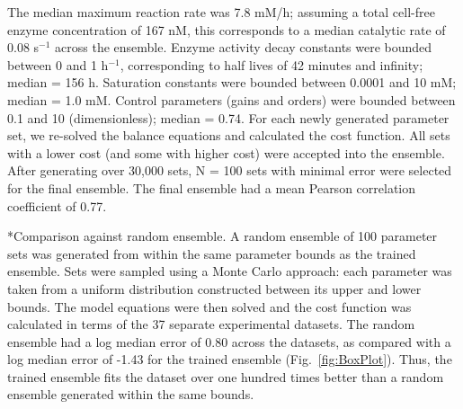 \documentclass[12pt]{article}
\makeatletter
\renewcommand\subsection{\@startsection
	{subsection}{2}{0mm}
	{-0.05in}
	{-0.5\baselineskip}
	{\normalfont\normalsize\bfseries}}
\makeatother
\begin{document}
The median maximum reaction rate was 7.8 mM/h; assuming a total cell-free enzyme concentration of 167 nM, this corresponds to a median catalytic rate of 0.08 s$^{-1}$ across the ensemble.
Enzyme activity decay constants were bounded between 0 and 1 h$^{-1}$, corresponding to half lives of 42 minutes and infinity; median = 156 h.
Saturation constants were bounded between 0.0001 and 10 mM; median = 1.0 mM.
Control parameters (gains and orders) were bounded between 0.1 and 10 (dimensionless); median = 0.74.
For each newly generated parameter set, we re-solved the balance equations and calculated the cost function.
All sets with a lower cost (and some with higher cost) were accepted into the ensemble.
After generating over 30,000 sets, N = 100 sets with minimal error were selected for the final ensemble.
The final ensemble had a mean Pearson correlation coefficient of 0.77.

\subsection*{Comparison against random ensemble.}
A random ensemble of 100 parameter sets was generated from within the same parameter bounds as the trained ensemble.
Sets were sampled using a Monte Carlo approach: each parameter was taken from a uniform distribution constructed between its upper and lower bounds.
The model equations were then solved and the cost function was calculated in terms of the 37 separate experimental datasets.
The random ensemble had a log median error of 0.80 across the datasets, as compared with a log median error of -1.43 for the trained ensemble (Fig.~\ref{fig:BoxPlot}).
Thus, the trained ensemble fits the dataset over one hundred times better than a random ensemble generated within the same bounds.
\end{document}

